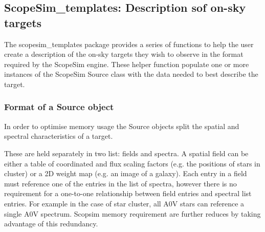 \subsection{ScopeSim\_templates: Description sof on-sky targets%
  \label{scopesim-templates-description-sof-on-sky-targets}%
}

The scopesim\_templates package provides a series of functions to help the user create a description of the on-sky targets they wish to observe in the format required by the ScopeSim engine.
These helper function populate one or more instances of the ScopeSim \textquotedbl{}Source\textquotedbl{} class with the data needed to best describe the target.


\subsubsection{Format of a Source object%
  \label{format-of-a-source-object}%
}

In order to optimise memory usage the Source objects split the spatial and spectral characteristics of a target.


These are held separately in two list: fields and spectra.
A spatial field can be either a table of coordinated and flux scaling factors (e.g. the positions of stars in cluster) or a 2D weight map (e.g. an image of a galaxy).
Each entry in a field must reference one of the entries in the list of spectra, however there is no requirement for a one-to-one relationship between field entries and spectral list entries.
For example in the case of star cluster, all A0V stars can reference a single A0V spectrum.
Scopsim memory requirement are further reduces by taking advantage of this redundancy.

